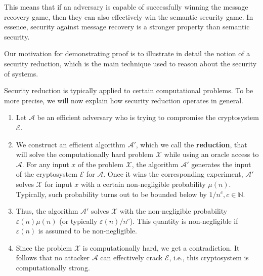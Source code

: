 \documentclass[../lecture-notes.tex]{subfiles}
\begin{document}
This means that if an adversary is capable of successfully winning the 
message recovery game, then they can also effectively win the semantic security game.
In essence, security against message recovery is a stronger property than
semantic security. 

Our motivation for demonstrating proof is to illustrate in detail the notion of a security
reduction, which is the main technique used to reason about the security of systems.

Security reduction is typically applied to certain computational problems. To be more precise, 
we will now explain how security reduction operates in general.
\begin{definition} 
    \hfill
    \begin{enumerate}
        \item Let $\mathcal{A}$ be an efficient adversary who is trying to
        compromise the cryptosystem $\mathcal{E}$.
        \item We construct an efficient algorithm $\mathcal{A}'$, which we call the
        \textbf{reduction}, that will solve the computationally hard problem
        $\mathcal{X}$ while using an oracle access to $\mathcal{A}$. For any
        input $x$ of the problem $\mathcal{X}$, the algorithm $\mathcal{A}'$
        generates the input of the cryptosystem $\mathcal{E}$ for $\mathcal{A}$.
        Once it wins the corresponding experiment, $\mathcal{A}'$ solves
        $\mathcal{X}$ for input $x$ with a certain non-negligible probability
        $\mu(n)$. Typically, such probability turns out to be bounded below by
        $1/n^c, c \in \mathbb{N}$.
        \item Thus, the algorithm $\mathcal{A}'$ solves $\mathcal{X}$ with the
        non-negligible probability $\varepsilon(n)\mu(n)$ (or typically
        $\varepsilon(n)/n^c$). This quantity is non-negligible 
        if $\varepsilon(n)$ is assumed to be non-negligible.
        \item Since the problem $\mathcal{X}$ is computationally hard, we get a
        contradiction. It follows that no attacker $\mathcal{A}$ can effectively
        crack $\mathcal{E}$, i.e., this cryptosystem is computationally strong.
    \end{enumerate}
\end{definition}

\end{document}
